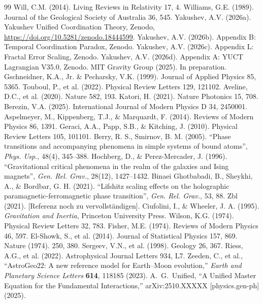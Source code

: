 \documentclass[12pt]{article}
\theoremstyle{remark}
\begin{document}
\begin{thebibliography}{99}
		 Will, C.M. (2014). Living Reviews in Relativity 17, 4.
		 Williams, G.E. (1989). Journal of the Geological Society of Australia 36, 545.
		 Yakushev, A.V. (2026a). Yakushev Unified Coordination Theory, Zenodo, \url{https://doi.org/10.5281/zenodo.18444599}.
		 Yakushev, A.V. (2026b). Appendix B: Temporal Coordination Paradox, Zenodo.
		 Yakushev, A.V. (2026c). Appendix L: Fractal Error Scaling, Zenodo.
		 Yakushev, A.V. (2026d). Appendix A: YUCT Lagrangian V35.0, Zenodo.
		 MIT Gravity Group (2025). In preparation.
		 Gschneidner, K.A., Jr. \& Pecharsky, V.K. (1999). Journal of Applied Physics 85, 5365.
		 Touboul, P., et al. (2022). Physical Review Letters 129, 121102.
		 Aveline, D.C., et al. (2020). Nature 582, 193.
		 Katori, H. (2021). Nature Photonics 15, 708.
		 Berezin, V.A. (2025). International Journal of Modern Physics D 34, 2450001.
		 Aspelmeyer, M., Kippenberg, T.J., \& Marquardt, F. (2014). Reviews of Modern Physics 86, 1391.
		 Geraci, A.A., Papp, S.B., \& Kitching, J. (2010). Physical Review Letters 105, 101101.
		 Berry, R. S., Smirnov, B. M. (2005). ``Phase transitions and accompanying phenomena in simple systems of bound atoms'', \textit{Phys. Usp.}, 48(4), 345–388.
		 Hochberg, D., \& Perez-Mercader, J. (1996). ``Gravitational critical phenomena in the realm of the galaxies and Ising magnets'', \textit{Gen. Rel. Grav.}, 28(12), 1427–1432.
		 Binaei Ghotbabadi, B., Sheykhi, A., \& Bordbar, G. H. (2021). ``Lifshitz scaling effects on the holographic paramagnetic-ferromagnetic phase transition'', \textit{Gen. Rel. Grav.}, 53, 88.
		 Zbl (2021). [Referenz noch zu vervollständigen].
		 Ciufolini, I., \& Wheeler, J. A. (1995). \textit{Gravitation and Inertia}, Princeton University Press.
		 Wilson, K.G. (1974). Physical Review Letters 32, 783.
		 Fisher, M.E. (1974). Reviews of Modern Physics 46, 597.
		 El-Showk, S., et al. (2014). Journal of Statistical Physics 157, 869.
		 Nature (1974). 250, 380.
		 Sergeev, V.N., et al. (1998). Geology 26, 367.
		 Riess, A.G., et al. (2022). Astrophysical Journal Letters 934, L7.
		 Zeeden, C., et al., ``AstroGeo22: A new reference model for Earth–Moon evolution,'' \emph{Earth and Planetary Science Letters} \textbf{614}, 118185 (2023).
		A.~G.~Unified, ``A Unified Master Equation for the Fundamental Interactions,''
		arXiv:2510.XXXXX [physics.gen-ph] (2025).
		

\end{thebibliography}
\end{document}
